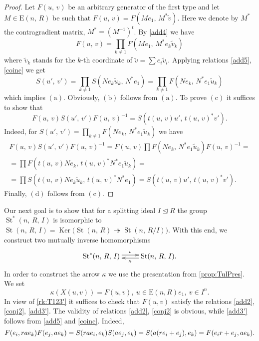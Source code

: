 \documentclass[11pt]{amsart}
\theoremstyle{plain} \declaretheorem[name=Theorem, Refname={Theorem,Theorems}]{tm} \Crefname{tm}{Theorem}{Theorems}
\numberwithin{equation}{section}
\theoremstyle{definition} \newtheorem{df}[lm]{Definition} \Crefname{df}{Definition}{Definitions}
\theoremstyle{remark} \newtheorem{rk}[lm]{Remark} \Crefname{rk}{Remark}{Remarks}
\newcommand{\Ker}{\mathop{\mathrm{Ker}}\nolimits}
\newcommand{\E}{{\mathrm{E}}}
\newcommand{\St}{\mathop{\mathrm{St}}\nolimits}
\newcommand{\epi}{\twoheadrightarrow}
\newcommand{\inv}{^{-1}}
\begin{document}
\begin{proof}
Let $F(u,\,v)$ be an arbitrary generator of the first type and let $M\in\E(n,\,R)$ be such that $F(u,\,v)=F(Me_1,\,M^*\tilde v)$. 
Here we denote by $M^*$ the contragradient matrix, $M^*=(M\inv)^t$. 
By \eqref{add4} we have $$F(u,\,v)=\prod\limits_{k\neq1}F(Me_1,\,M^*e_k\tilde v_k)$$
where $\tilde v_k$ stands for the $k$-th coordinate of $\tilde v=\sum e_i\tilde v_i$.
Applying relations \eqref{add5}, \eqref{coinc} we get
$$S(u',\,v')=\prod\limits_{k\neq1}S(Ne_k\tilde u_k,\,N^*e_1)=\prod\limits_{k\neq1}F(Ne_k,\,N^*e_1\tilde u_k)$$
which implies $(\mathrm{a})$. Obviously, $(\mathrm{b})$ follows from $(\mathrm{a})$. 
To prove $(\mathrm{c})$ it suffices to show that
$$F(u,\,v)S(u',\,v')F(u,\,v)\inv=S(t(u,\,v)u',\,t(u,\,v)^*v').$$
Indeed, for $S(u',\,v')=\prod_{k\neq 1} F(Ne_k,\,N^*e_1\tilde u_k)$ we have
\begin{multline*}
F(u,\,v)S(u',\,v')F(u,\,v)\inv=F(u,\,v)\prod F(Ne_k,\,N^*e_1\tilde u_k)F(u,\,v)\inv=\\
=\prod F(t(u,\,v)Ne_k,\,t(u,\,v)^*N^*e_1\tilde u_k)=\\
=\prod S(t(u,\,v)Ne_k\tilde u_k,\,t(u,\,v)^*N^*e_1)=S(t(u,\,v)u',\,t(u,\,v)^*v').
\end{multline*}
Finally, $(\mathrm{d})$ follows from $(\mathrm{c})$.
\end{proof}

Our next goal is to show that for a splitting ideal $I\trianglelefteq R$ the group $\St^*(n,\,R,\,I)$ is isomorphic to $\St(n,\,R,\,I)=\Ker\big(\St(n,\,R)\epi\St(n,\,R/I)\big)$.
With this end, we construct two mutually inverse homomorphisms
$$\xymatrix{\St^*(n,\,R,\,I)\ar@<0.5ex>[r]^{\iota}&\St(n,\,R,\,I)\ar@<0.5ex>[l]^{\kappa}.}$$
In order to construct the arrow $\kappa$ we use the presentation from \cref{prop:TulPres}.
We set $$\kappa(X(u,v)) = F(u,v),\ u\in \E(n, R)e_1,\ v\in I^n.$$ 
In view of \cref{rk:T123'} it suffices to check that $F(u,v)$ satisfy the relations \eqref{add2}, \eqref{conj2}, \eqref{add3'}.
The validity of relations \eqref{add2}, \eqref{conj2} is obvious, while \eqref{add3'} follows from \eqref{add5} and \eqref{coinc}. Indeed,
$$ F(e_i, rae_k) F(e_j, ae_k) = S(rae_i, e_k) S(ae_j, e_k) = S(a(re_i+e_j), e_k) = F(e_ir+e_j, ae_k). \qedhere $$
\end{document}
